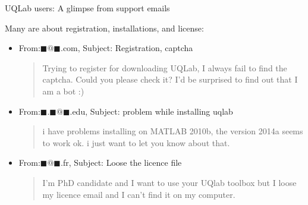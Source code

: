 \documentclass[]{rsuqbeamernew}
\begin{document}
\begin{frame}{UQLab users: A glimpse from support emails}

Many are about registration, installations, and license:

\begin{itemize}
  \item From:$\blacksquare@\blacksquare$.com, Subject: Registration, captcha
    \begin{quotation}
      Trying to register for downloading UQLab, I always fail to find the captcha.
      Could you please check it? I'd be surprised to find out that I am a bot :)
    \end{quotation}
  
  \item From:$\blacksquare.\blacksquare@\blacksquare$.edu, Subject: problem while installing uqlab
    \begin{quotation}
      i have problems installing on MATLAB 2010b, the version 2014a seems to work ok. i just want to let you know about that. 
    \end{quotation}

  \item From:$\blacksquare@\blacksquare$.fr, Subject: Loose the licence file
    \begin{quotation}
      I'm PhD candidate and I want to use your UQlab toolbox but I loose my licence email and I can't find it on my computer.
    \end{quotation}
    
\end{itemize}

\end{frame}
\end{document}
